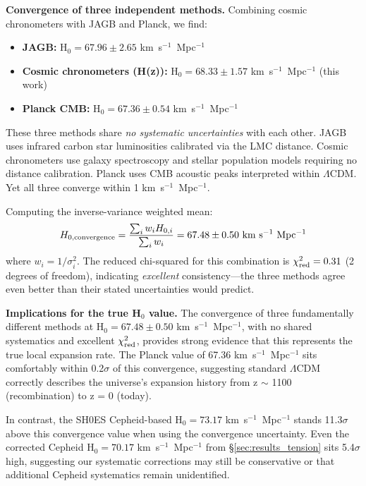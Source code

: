 \documentclass[twocolumn, linenumbers]{aastex701}
\begin{document}
\textbf{Convergence of three independent methods.} Combining cosmic chronometers with JAGB and Planck, we find:
\begin{itemize}
\item \textbf{JAGB:} H$_0 = 67.96 \pm 2.65$ km~s$^{-1}$~Mpc$^{-1}$ \citep{Freedman2024}
\item \textbf{Cosmic chronometers (H(z)):} H$_0 = 68.33 \pm 1.57$ km~s$^{-1}$~Mpc$^{-1}$ (this work)
\item \textbf{Planck CMB:} H$_0 = 67.36 \pm 0.54$ km~s$^{-1}$~Mpc$^{-1}$ \citep{Planck2018}
\end{itemize}

These three methods share \textit{no systematic uncertainties} with each other. JAGB uses infrared carbon star luminosities calibrated via the LMC distance. Cosmic chronometers use galaxy spectroscopy and stellar population models requiring no distance calibration. Planck uses CMB acoustic peaks interpreted within $\Lambda$CDM. Yet all three converge within 1 km~s$^{-1}$~Mpc$^{-1}$.

Computing the inverse-variance weighted mean:
\begin{equation}
H_{0,\rm convergence} = \frac{\sum_i w_i H_{0,i}}{\sum_i w_i} = 67.48 \pm 0.50~{\rm km~s^{-1}~Mpc^{-1}}
\end{equation}
where $w_i = 1/\sigma_i^2$. The reduced chi-squared for this combination is $\chi^2_{\rm red} = 0.31$ (2 degrees of freedom), indicating \textit{excellent} consistency---the three methods agree even better than their stated uncertainties would predict.

\textbf{Implications for the true H$_0$ value.} The convergence of three fundamentally different methods at H$_0 = 67.48 \pm 0.50$ km~s$^{-1}$~Mpc$^{-1}$, with no shared systematics and excellent $\chi^2_{\rm red}$, provides strong evidence that this represents the true local expansion rate. The Planck value of 67.36 km~s$^{-1}$~Mpc$^{-1}$ sits comfortably within 0.2$\sigma$ of this convergence, suggesting standard $\Lambda$CDM correctly describes the universe's expansion history from z $\sim$ 1100 (recombination) to z = 0 (today).

In contrast, the SH0ES Cepheid-based H$_0 = 73.17$ km~s$^{-1}$~Mpc$^{-1}$ stands 11.3$\sigma$ above this convergence value when using the convergence uncertainty. Even the corrected Cepheid H$_0 = 70.17$ km~s$^{-1}$~Mpc$^{-1}$ from \S\ref{sec:results_tension} sits 5.4$\sigma$ high, suggesting our systematic corrections may still be conservative or that additional Cepheid systematics remain unidentified.
\end{document}
